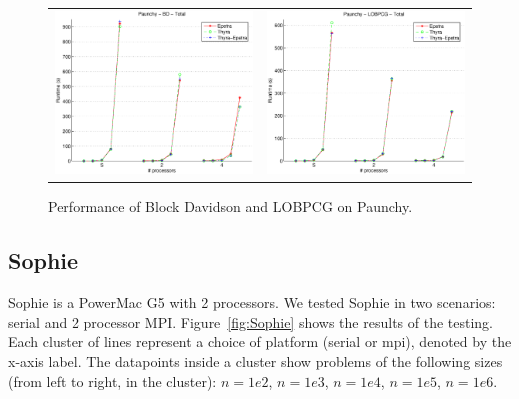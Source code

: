 \documentclass[10pt]{article}
\begin{document}
\begin{figure}[htp]
\begin{tabular}{cc}
\includegraphics[width=2.50in]{results/paunchy/Paunchy-BD-Total_ln.eps} &
\includegraphics[width=2.50in]{results/paunchy/Paunchy-LOBPCG-Total_ln.eps} 
\end{tabular}
\caption{Performance of Block Davidson and LOBPCG on Paunchy.}
\label{fig:Paunchy}
\end{figure}

\subsection{Sophie}

Sophie is a PowerMac G5 with 2 processors. We tested Sophie in two scenarios: serial 
and 2 processor MPI. Figure~\ref{fig:Sophie} shows the results of
the testing. Each cluster of lines represent a choice of platform (serial or mpi), denoted
by the x-axis label. The datapoints inside a cluster show problems of the following sizes
(from left to right, in the cluster): $n=1e2$, $n=1e3$, $n=1e4$, $n=1e5$, $n=1e6$.
\end{document}

